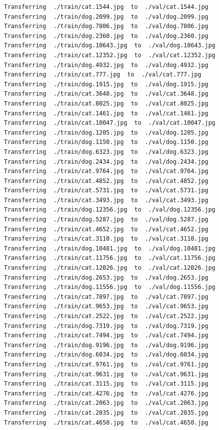 \documentclass[]{book}
\theoremstyle{definition}
\theoremstyle{definition}
\theoremstyle{definition}
\theoremstyle{remark}
\begin{document}
\begin{verbatim}
Transferring  ./train/cat.1544.jpg  to  ./val/cat.1544.jpg
Transferring  ./train/dog.2099.jpg  to  ./val/dog.2099.jpg
Transferring  ./train/dog.7806.jpg  to  ./val/dog.7806.jpg
Transferring  ./train/dog.2360.jpg  to  ./val/dog.2360.jpg
Transferring  ./train/dog.10643.jpg  to  ./val/dog.10643.jpg
Transferring  ./train/cat.12352.jpg  to  ./val/cat.12352.jpg
Transferring  ./train/dog.4932.jpg  to  ./val/dog.4932.jpg
Transferring  ./train/cat.777.jpg  to  ./val/cat.777.jpg
Transferring  ./train/dog.1915.jpg  to  ./val/dog.1915.jpg
Transferring  ./train/cat.3648.jpg  to  ./val/cat.3648.jpg
Transferring  ./train/cat.8025.jpg  to  ./val/cat.8025.jpg
Transferring  ./train/cat.1461.jpg  to  ./val/cat.1461.jpg
Transferring  ./train/cat.10047.jpg  to  ./val/cat.10047.jpg
Transferring  ./train/dog.1205.jpg  to  ./val/dog.1205.jpg
Transferring  ./train/dog.1150.jpg  to  ./val/dog.1150.jpg
Transferring  ./train/dog.6323.jpg  to  ./val/dog.6323.jpg
Transferring  ./train/dog.2434.jpg  to  ./val/dog.2434.jpg
Transferring  ./train/cat.9764.jpg  to  ./val/cat.9764.jpg
Transferring  ./train/cat.4852.jpg  to  ./val/cat.4852.jpg
Transferring  ./train/cat.5731.jpg  to  ./val/cat.5731.jpg
Transferring  ./train/cat.3493.jpg  to  ./val/cat.3493.jpg
Transferring  ./train/dog.12356.jpg  to  ./val/dog.12356.jpg
Transferring  ./train/dog.5287.jpg  to  ./val/dog.5287.jpg
Transferring  ./train/cat.4652.jpg  to  ./val/cat.4652.jpg
Transferring  ./train/cat.3110.jpg  to  ./val/cat.3110.jpg
Transferring  ./train/dog.10481.jpg  to  ./val/dog.10481.jpg
Transferring  ./train/cat.11756.jpg  to  ./val/cat.11756.jpg
Transferring  ./train/cat.12026.jpg  to  ./val/cat.12026.jpg
Transferring  ./train/dog.2653.jpg  to  ./val/dog.2653.jpg
Transferring  ./train/dog.11556.jpg  to  ./val/dog.11556.jpg
Transferring  ./train/cat.7897.jpg  to  ./val/cat.7897.jpg
Transferring  ./train/cat.9653.jpg  to  ./val/cat.9653.jpg
Transferring  ./train/cat.2522.jpg  to  ./val/cat.2522.jpg
Transferring  ./train/dog.7319.jpg  to  ./val/dog.7319.jpg
Transferring  ./train/cat.7494.jpg  to  ./val/cat.7494.jpg
Transferring  ./train/dog.9196.jpg  to  ./val/dog.9196.jpg
Transferring  ./train/dog.6034.jpg  to  ./val/dog.6034.jpg
Transferring  ./train/cat.9761.jpg  to  ./val/cat.9761.jpg
Transferring  ./train/cat.9631.jpg  to  ./val/cat.9631.jpg
Transferring  ./train/cat.3115.jpg  to  ./val/cat.3115.jpg
Transferring  ./train/cat.4276.jpg  to  ./val/cat.4276.jpg
Transferring  ./train/cat.2063.jpg  to  ./val/cat.2063.jpg
Transferring  ./train/cat.2035.jpg  to  ./val/cat.2035.jpg
Transferring  ./train/cat.4650.jpg  to  ./val/cat.4650.jpg

\end{verbatim}
\end{document}
